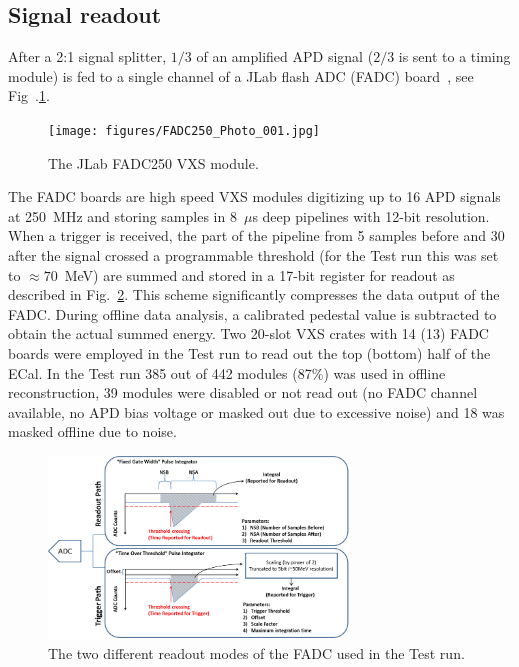 \documentclass[final,3p,times,twocolumn]{elsarticle}
\begin{document}
\subsection{Signal readout}
\label{sec:fadc}
After a 2:1 signal splitter, $1/3$ of an amplified APD signal ($2/3$ is sent to a timing module) is fed to a 
single channel of a JLab flash ADC (FADC) board~\cite{fadc}, 
see Fig~.\ref{fig:fadc}.
\begin{figure}[]
\begin{center}
{\small
\texttt{[image: figures/FADC250\_Photo\_001.jpg]}
\caption{The JLab FADC250 VXS module.}
\label{fig:fadc}
}
\end{center}
\end{figure}
The FADC boards are high speed VXS modules digitizing up to 16 APD signals 
at 250~MHz and storing samples in 8~$\mu$s deep pipelines with 12-bit resolution. 
When a trigger is received, the part 
of the pipeline from 5 samples before and 30 after the signal crossed a programmable 
threshold (for the Test run this was set to $\approx70$~MeV) are 
summed and stored in a 17-bit register for readout as described in Fig.~\ref{fig:hps_trigger_data}.
This scheme significantly compresses the data output of the FADC. During offline data analysis, a 
calibrated pedestal value is subtracted to obtain the actual summed energy.
Two 20-slot VXS crates with 14 (13) FADC boards were employed in the Test run to read out the top 
(bottom) half of the ECal.
In the Test run 385 out of 442 modules (87\%) was used in offline reconstruction, 39 modules were 
disabled or not read out (no FADC channel available, no APD bias voltage or masked out due to 
excessive noise) and 18 was masked offline due to noise. 
\begin{figure}[]
\begin{center}
{\small
\includegraphics[width=8cm]{figures/fadc_datapath_diagram.png}
\caption{The two different readout modes of the FADC used in the Test run.}
\label{fig:hps_trigger_data}
}
\end{center}
\end{figure}
\end{document}

